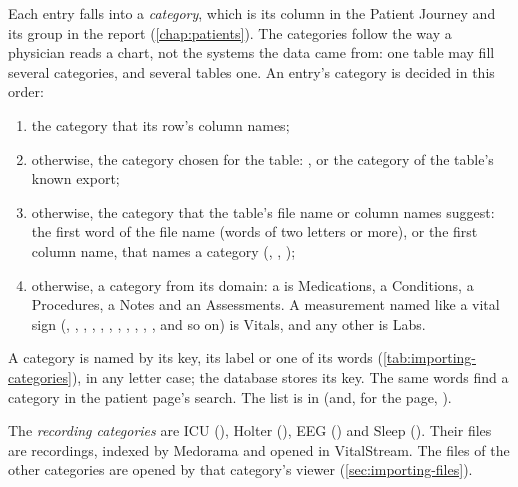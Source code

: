 Each entry falls into a \emph{category}, which is its column in the Patient Journey and its group
in the report (\cref{chap:patients}). The categories follow the way a physician reads a chart,
not the systems the data came from: one table may fill several categories, and several tables
one. An entry's category is decided in this order:
\begin{enumerate}
\item the category that its row's  column names;
\item otherwise, the category chosen for the table: , or the category of the
  table's known export;
\item otherwise, the category that the table's file name or column names suggest: the first word
  of the file name (words of two letters or more), or the first column name, that names a
  category (, , );
\item otherwise, a category from its domain: a  is Medications, a 
  Conditions, a  Procedures, a  Notes and an 
  Assessments. A measurement named like a vital sign (, ,
  , , , , , ,
  , , ,  and so on) is Vitals, and any other is
  Labs.
\end{enumerate}
A category is named by its key, its label or one of its words (\cref{tab:importing-categories}),
in any letter case; the database stores its key. The same words find a category in the patient
page's search. The list is  in  (and, for
the page, ).

The \emph{recording categories} are ICU (), Holter (), EEG ()
and Sleep (). Their files are recordings, indexed by Medorama and opened in
VitalStream. The files of the other categories are opened by that category's viewer
(\cref{sec:importing-files}).

